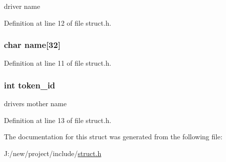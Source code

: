 driver name 



Definition at line 12 of file struct.\-h.

\hypertarget{structdriver__info_abc1e86d7c344fe34ff09e72d4595ab7e}{
\subsubsection[{name}]{\setlength{\rightskip}{0pt plus 5cm}char {\bf name}\mbox{[}32\mbox{]}}}\label{structdriver__info_abc1e86d7c344fe34ff09e72d4595ab7e}


Definition at line 11 of file struct.\-h.

\hypertarget{structdriver__info_ac10e2e2d66be333d039b75217892053d}{
\subsubsection[{token\-\_\-id}]{\setlength{\rightskip}{0pt plus 5cm}int {\bf token\-\_\-id}}}\label{structdriver__info_ac10e2e2d66be333d039b75217892053d}


drivers mother name 



Definition at line 13 of file struct.\-h.



The documentation for this struct was generated from the following file\-:\begin{DoxyCompactItemize}
\item 
J\-:/new/project/include/\hyperlink{struct_8h}{struct.\-h}\end{DoxyCompactItemize}

